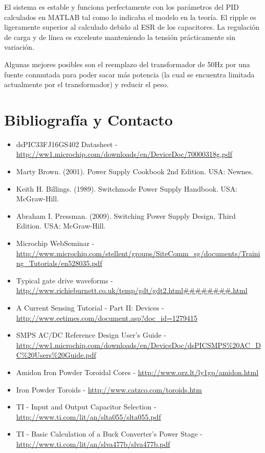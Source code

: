 \documentclass[12pt]{report}
\begin{document}
El sistema es estable y funciona perfectamente con los parámetros del PID calculados en MATLAB tal como lo indicaba el modelo en la teoría. El ripple es ligeramente superior al calculado debido al ESR de los capacitores. La regulación de carga y de línea es excelente manteniendo la tensión prácticamente sin variación.

Algunas mejores posibles son el reemplazo del transformador de 50Hz por una fuente conmutada para poder sacar más potencia (la cual se encuentra limitada actualmente por el transformador) y reducir el peso. 

\newpage
\chapter{Bibliografía y Contacto}

\begin{itemize}
	\item dsPIC33FJ16GS402 Datasheet - \url{http://ww1.microchip.com/downloads/en/DeviceDoc/70000318g.pdf}
	\item Marty Brown. (2001). Power Supply Cookbook 2nd Edition. USA: Newnes.
	\item Keith H. Billings. (1989). Switchmode Power Supply Handbook. USA: McGraw-Hill.
	\item Abraham I. Pressman. (2009). Switching Power Supply Design, Third Edition. USA: McGraw-Hill.
	\item Microchip WebSeminar - \url{http://www.microchip.com/stellent/groups/SiteComm_sg/documents/Training_Tutorials/en528035.pdf}
	\item Typical gate drive waveforms - \url{http://www.richieburnett.co.uk/temp/gdt/gdt2.html########.html}
	\item A Current Sensing Tutorial - Part II: Devices - \url{http://www.eetimes.com/document.asp?doc_id=1279415}
	\item SMPS AC/DC Reference Design User's Guide - \url{http://ww1.microchip.com/downloads/en/DeviceDoc/dsPICSMPS\%20AC_DC\%20Users\%20Guide.pdf}
	\item Amidon Iron Powder Toroidal Cores - \url{http://www.qrz.lt/ly1gp/amidon.html}
	\item Iron Powder Toroids - \url{http://www.catzco.com/toroids.htm}
	\item TI - Input and Output Capacitor Selection - \url{http://www.ti.com/lit/an/slta055/slta055.pdf}
	\item TI - Basic Calculation of a Buck Converter's Power Stage - \url{http://www.ti.com/lit/an/slva477b/slva477b.pdf}

\end{itemize}
\end{document}
